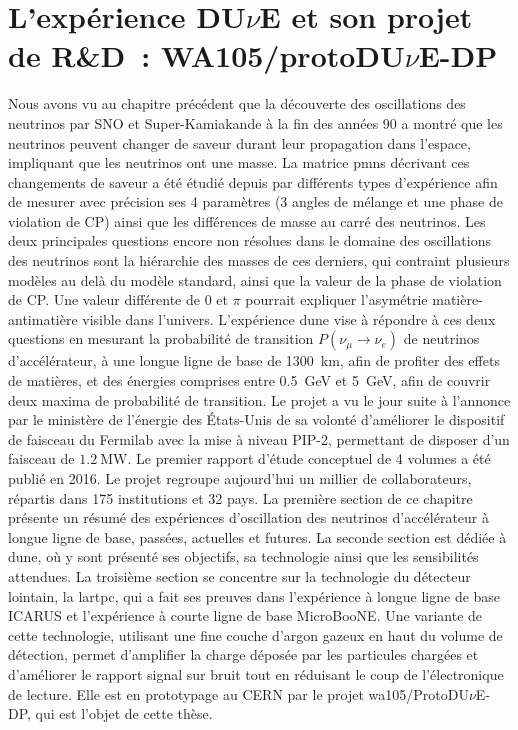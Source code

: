 \chapter{L'expérience \texorpdfstring{DU$\nu$E}{DUNE} et son projet de R\&D~: \texorpdfstring{WA105/protoDU$\nu$E-DP}{protoDUNE}}
    
    Nous avons vu au chapitre précédent que la découverte des oscillations des neutrinos par SNO et Super-Kamiakande à la fin des années 90 a montré que les neutrinos peuvent changer de saveur durant leur propagation dans l'espace, impliquant que les neutrinos ont une masse. La matrice \gls{pmns} décrivant ces changements de saveur a été étudié depuis par différents types d'expérience afin de mesurer avec précision ses 4 paramètres (3 angles de mélange et une phase de violation de CP) ainsi que les différences de masse au carré des neutrinos. Les deux principales questions encore non résolues dans le domaine des oscillations des neutrinos sont la hiérarchie des masses de ces derniers, qui contraint plusieurs modèles au delà du modèle standard, ainsi que la valeur de la phase de violation de CP. Une valeur différente de 0 et $\pi$ pourrait expliquer l'asymétrie matière-antimatière visible dans l'univers. L'expérience \gls{dune} vise à répondre à ces deux questions en mesurant la probabilité de transition $P(\nu_{\mu}\to\nu_e)$ de neutrinos d'accélérateur, à une longue ligne de base de \SI{1300}{\kilo\meter}, afin de profiter des effets de matières, et des énergies comprises entre \SI{0.5}{\giga\electronvolt} et \SI{5}{\giga\electronvolt}, afin de couvrir deux maxima de probabilité de transition. Le projet a vu le jour suite à l'annonce par le ministère de l'énergie des États-Unis de sa volonté d'améliorer le dispositif de faisceau du Fermilab avec la mise à niveau PIP-2, permettant de disposer d'un faisceau de $\SI{1.2}{\mega\watt}$. Le premier rapport d'étude conceptuel de 4 volumes a été publié en 2016. Le projet regroupe aujourd'hui un millier de collaborateurs, répartis dans 175 institutions et 32 pays. La première section de ce chapitre présente un résumé des expériences d'oscillation des neutrinos d'accélérateur à longue ligne de base, passées, actuelles et futures. La seconde section est dédiée à \gls{dune}, où y sont présenté ses objectifs, sa technologie ainsi que les sensibilités attendues. La troisième section se concentre sur la technologie du détecteur lointain, la \gls{lartpc}, qui a fait ses preuves dans l'expérience à longue ligne de base ICARUS et l'expérience à courte ligne de base MicroBooNE. Une variante de cette technologie, utilisant une fine couche d'argon gazeux en haut du volume de détection, permet d'amplifier la charge déposée par les particules chargées et d'améliorer le rapport signal sur bruit tout en réduisant le coup de l'électronique de lecture. Elle est en prototypage au CERN par le projet \gls{wa105}/ProtoDU$\nu$E-DP, qui est l'objet de cette thèse.
        
